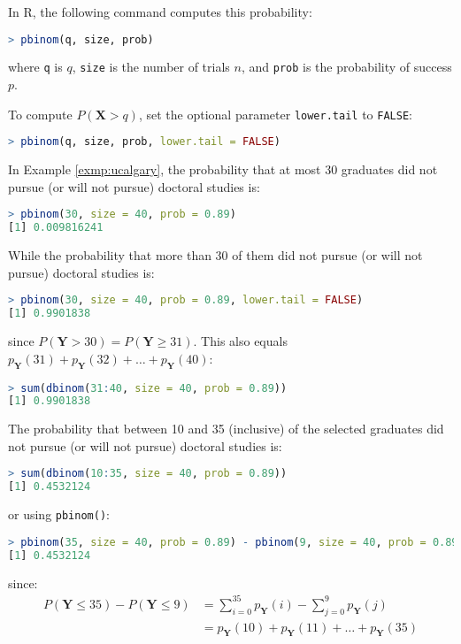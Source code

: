 In R, the following command computes this probability:
\begin{lstlisting}[language=R]
> pbinom(q, size, prob)
\end{lstlisting}
where \verb|q| is \( q \), \verb|size| is the number of trials \( n \), and \verb|prob| is the probability of success \( p \).

To compute \( P(\bm{X} > q) \), set the optional parameter \verb|lower.tail| to \verb|FALSE|:
\begin{lstlisting}[language=R]
> pbinom(q, size, prob, lower.tail = FALSE)
\end{lstlisting}
\begin{exmp}
    In Example \autoref{exmp:ucalgary}, the probability that at most 30 graduates did not pursue (or will not pursue) doctoral studies is:
    \begin{lstlisting}[language=R]
> pbinom(30, size = 40, prob = 0.89)
[1] 0.009816241
    \end{lstlisting}
    While the probability that more than 30 of them did not pursue (or will not pursue) doctoral studies is:
    \begin{lstlisting}[language=R]
> pbinom(30, size = 40, prob = 0.89, lower.tail = FALSE)
[1] 0.9901838
    \end{lstlisting}
    since \( P(\bm{Y} > 30) = P(\bm{Y} \geq 31) \).
    This also equals \( p_{\bm{Y}}(31) + p_{\bm{Y}}(32) + \ldots + p_{\bm{Y}}(40) \):
    \begin{lstlisting}[language=R]
> sum(dbinom(31:40, size = 40, prob = 0.89))
[1] 0.9901838
    \end{lstlisting}
    The probability that between 10 and 35 (inclusive) of the selected graduates did not pursue (or will not pursue) doctoral studies is:
    \begin{lstlisting}[language=R]
> sum(dbinom(10:35, size = 40, prob = 0.89))
[1] 0.4532124
    \end{lstlisting}
    or using \verb|pbinom()|:
    \begin{lstlisting}[language=R]
> pbinom(35, size = 40, prob = 0.89) - pbinom(9, size = 40, prob = 0.89)
[1] 0.4532124
    \end{lstlisting}
    since:
    \begin{align*}
        P(\bm{Y} \leq 35) - P(\bm{Y} \leq 9) &= \sum_{i = 0}^{35} p_{\bm{Y}}(i) - \sum_{j = 0}^{9} p_{\bm{Y}}(j)\\
        &= p_{\bm{Y}}(10) + p_{\bm{Y}}(11) + \ldots + p_{\bm{Y}}(35)
    \end{align*}
\end{exmp}


